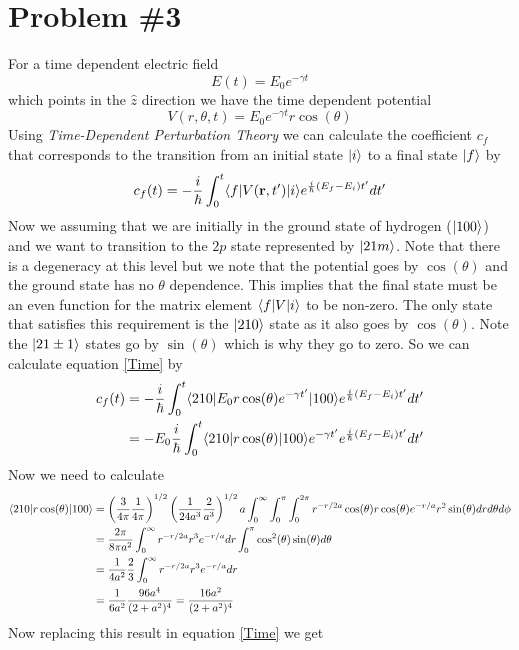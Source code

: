 \documentclass[11pt]{article}
\numberwithin{equation}{section}
\begin{document}
\section{Problem \#3}
For a time dependent electric field
$$E(t) = E_0e^{-\gamma t}$$
which points in the $\hat{z}$ direction we have the time dependent potential
$$V(r,\theta, t) = E_0e^{-\gamma t}r\cos(\theta)$$
Using \emph{Time-Dependent Perturbation Theory} we can calculate the coefficient $c_f$ that corresponds to the transition from an initial state $|{i}\rangle$ to a final state $|{f}\rangle$ by
\begin{equation}
c_f(t) = -\frac{i}{\hbar}\int_{0}^{t}\langle{f}|V(\mathbf{r},t')|{i}\rangle e^{\frac{i}{\hbar}(E_f-E_i)t'}dt'
\label{Time}
\end{equation}
Now we assuming that we are initially in the ground state of hydrogen ($|{100}\rangle$) and we want to transition to the $2p$ state represented by $|{21m}\rangle$. Note that there is a degeneracy at this level but we note that the potential goes by $\cos(\theta)$ and the ground state has no $\theta$ dependence. This implies that the final state must be an even function for the matrix element $\langle{f}|V|{i}\rangle$ to be non-zero. The only state that satisfies this requirement is the $|{210}\rangle$ state as it also goes by $\cos(\theta)$. Note the $|{21\pm1}\rangle$ states go by $\sin(\theta)$ which is why they go to zero. So we can calculate equation \ref{Time} by
\begin{align*}
c_f(t) &= -\frac{i}{\hbar}\int_{0}^{t}\langle{210}|E_0r\cos(\theta)e^{-\gamma t'}|{100}\rangle e^{\frac{i}{\hbar}(E_f-E_i)t'}dt'\\
&= -E_0\frac{i}{\hbar}\int_{0}^{t}\langle{210}|r\cos(\theta)|{100}\rangle e^{-\gamma t'}e^{\frac{i}{\hbar}(E_f-E_i)t'}dt'
\end{align*}
Now we need to calculate
\begin{align*}
\langle{210}|r\cos(\theta)|{100}\rangle &= \left(\frac{3}{4\pi}\frac{1}{4\pi}\right)^{1/2}\left(\frac{1}{24a^3}\frac{2}{a^3}\right)^{1/2}a\int_{0}^{\infty}\int_{0}^{\pi}\int_{0}^{2\pi}r^{-r/2a}\cos(\theta)r\cos(\theta)e^{-r/a}r^2\sin(\theta)drd\theta d\phi\\
&= \frac{2\pi}{8\pi a^2}\int_{0}^{\infty}r^{-r/2a}r^3e^{-r/a}dr\int_{0}^{\pi}\cos^2(\theta)\sin(\theta)d\theta\\
&= \frac{1}{4a^2}\frac{2}{3}\int_{0}^{\infty}r^{-r/2a}r^3e^{-r/a}dr\\
&= \frac{1}{6a^2}\frac{96a^4}{(2+a^2)^4} = \frac{16a^2}{(2+a^2)^4}
\end{align*}
Now replacing this result in equation \ref{Time} we get
\end{document}
